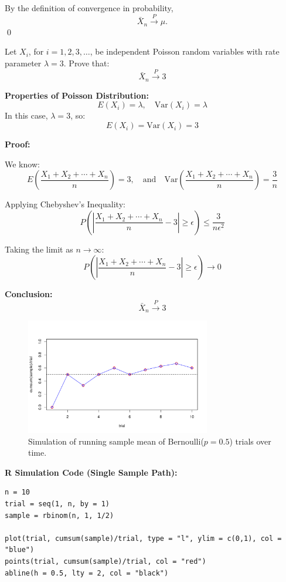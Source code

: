 By the definition of convergence in probability,
\[
\bar{X}_n \xrightarrow{P} \mu.
\]
\qed
\begin{example}

Let \( X_i \), for \( i = 1, 2, 3, \ldots \), be independent Poisson random variables with rate parameter \( \lambda = 3 \). Prove that:
\[
\bar{X}_n \xrightarrow{P} 3
\]

\textbf{Properties of Poisson Distribution:}
\[
E(X_i) = \lambda, \quad \mathrm{Var}(X_i) = \lambda
\]
In this case, \( \lambda = 3 \), so:
\[
E(X_i) = \mathrm{Var}(X_i) = 3
\]

\textbf{Proof:}

We know:
\[
E\left( \frac{X_1 + X_2 + \cdots + X_n}{n} \right) = 3, \quad \text{and} \quad
\mathrm{Var}\left( \frac{X_1 + X_2 + \cdots + X_n}{n} \right) = \frac{3}{n}
\]

Applying Chebyshev’s Inequality:
\[
P\left( \left| \frac{X_1 + X_2 + \cdots + X_n}{n} - 3 \right| \geq \epsilon \right) \leq \frac{3}{n \epsilon^2}
\]

Taking the limit as \( n \to \infty \):
\[
P\left( \left| \frac{X_1 + X_2 + \cdots + X_n}{n} - 3 \right| \geq \epsilon \right) \to 0
\]

\textbf{Conclusion:}
\[
\bar{X}_n \xrightarrow{P} 3
\]
\end{example}
\begin{figure}[h!]
  \centering
  \includegraphics[width=0.72\textwidth]{Section5/images/simulation_plot.pdf}
  \caption{Simulation of running sample mean of Bernoulli(\(p = 0.5\)) trials over time.}
\end{figure}

\noindent\textbf{R Simulation Code (Single Sample Path):}
\begin{tcolorbox}[
    colback=gray!10,
    colframe=black!45,
    arc=2mm,
    enhanced,
    breakable,
    width=\textwidth,
    boxsep=0pt,
    left=4pt,    %
    right=8pt,   %
    top=2pt,
    bottom=2pt
]
\begin{verbatim}
n = 10
trial = seq(1, n, by = 1)
sample = rbinom(n, 1, 1/2)

plot(trial, cumsum(sample)/trial, type = "l", ylim = c(0,1), col = "blue")
points(trial, cumsum(sample)/trial, col = "red")
abline(h = 0.5, lty = 2, col = "black")
\end{verbatim}
\end{tcolorbox}


